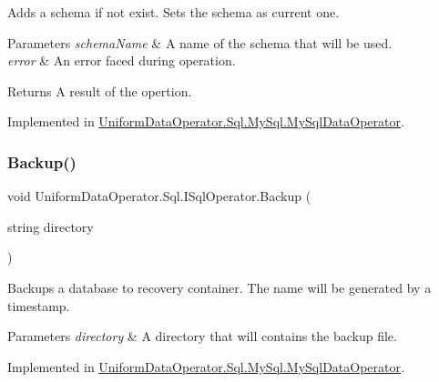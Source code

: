 Adds a schema if not exist. Sets the schema as current one. 


\begin{DoxyParams}{Parameters}
{\em schema\+Name} & A name of the schema that will be used.\\
\hline
{\em error} & An error faced during operation.\\
\hline
\end{DoxyParams}
\begin{DoxyReturn}{Returns}
A result of the opertion.
\end{DoxyReturn}


Implemented in \mbox{\hyperlink{class_uniform_data_operator_1_1_sql_1_1_my_sql_1_1_my_sql_data_operator_a2ed7d06bc016ae6d07cbcceffc21bbd3}{Uniform\+Data\+Operator.\+Sql.\+My\+Sql.\+My\+Sql\+Data\+Operator}}.

\mbox{\label{interface_uniform_data_operator_1_1_sql_1_1_i_sql_operator_a096be4f746c1fcbb8b2894c2517b937c}} 
\subsubsection{\texorpdfstring{Backup()}{Backup()}}
{\footnotesize\ttfamily void Uniform\+Data\+Operator.\+Sql.\+I\+Sql\+Operator.\+Backup (\begin{DoxyParamCaption}\item[{string}]{directory }\end{DoxyParamCaption})}



Backups a database to recovery container. The name will be generated by a timestamp. 


\begin{DoxyParams}{Parameters}
{\em directory} & A directory that will contains the backup file. \\
\hline
\end{DoxyParams}


Implemented in \mbox{\hyperlink{class_uniform_data_operator_1_1_sql_1_1_my_sql_1_1_my_sql_data_operator_a0dbd58206733a17dd26143b58d0859d7}{Uniform\+Data\+Operator.\+Sql.\+My\+Sql.\+My\+Sql\+Data\+Operator}}.

